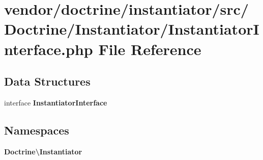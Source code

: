 \section{vendor/doctrine/instantiator/src/\+Doctrine/\+Instantiator/\+Instantiator\+Interface.php File Reference}
\label{_instantiator_interface_8php}
\subsection*{Data Structures}
\begin{DoxyCompactItemize}
\item 
interface {\bf Instantiator\+Interface}
\end{DoxyCompactItemize}
\subsection*{Namespaces}
\begin{DoxyCompactItemize}
\item 
 {\bf Doctrine\textbackslash{}\+Instantiator}
\end{DoxyCompactItemize}
